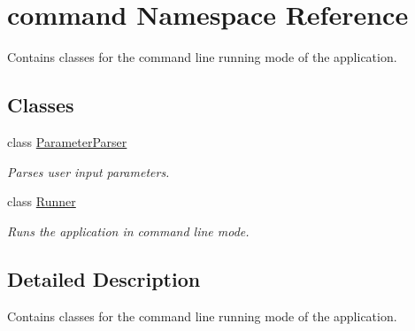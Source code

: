 \hypertarget{namespacecommand}{
\section{command Namespace Reference}
\label{namespacecommand}
}


Contains classes for the command line running mode of the application.  


\subsection*{Classes}
\begin{DoxyCompactItemize}
\item 
class \hyperlink{classcommand_1_1_parameter_parser}{ParameterParser}
\begin{DoxyCompactList}\small\item\em Parses user input parameters. \item\end{DoxyCompactList}\item 
class \hyperlink{classcommand_1_1_runner}{Runner}
\begin{DoxyCompactList}\small\item\em Runs the application in command line mode. \item\end{DoxyCompactList}\end{DoxyCompactItemize}


\subsection{Detailed Description}
Contains classes for the command line running mode of the application. 